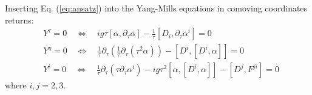 Inserting Eq. (\ref{eq:ansatz}) into the Yang-Mills equations in comoving coordinates returns:
\begin{subequations}
\begin{align}
	& Y^\tau = 0 \quad \Leftrightarrow \quad ig\tau \left[\alpha, \partial_\tau \alpha \right] - \frac{1}{\tau} \left[D_i, \partial_\tau \alpha^i \right] = 0 \\
	& Y^\eta = 0 \quad \Leftrightarrow \quad \frac{1}{\tau} \partial_\tau \left( \frac{1}{\tau} \partial_\tau \left( \tau^2 \alpha \right) \right) - \left[D^i, \left[D^i, \alpha \right] \right] = 0 \\
	& Y^i = 0 \quad \Leftrightarrow \quad \frac{1}{\tau} \partial_\tau \left( \tau \partial_\tau \alpha^i \right) - ig\tau^2 \left[\alpha, \left[D^i,\alpha \right] \right] - [D^j, F^{ji}] = 0
\end{align}
\end{subequations}
where $i,j=2,3$.

